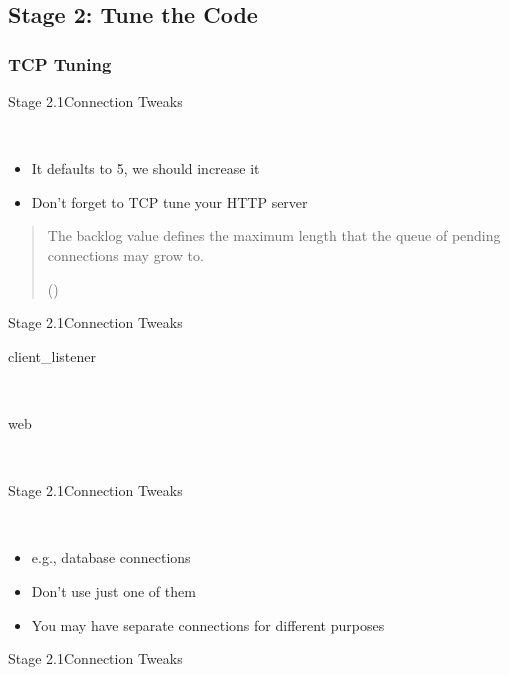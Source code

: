 \documentclass[utf8,hyperref={colorlinks=true}]{beamer}
\newenvironment{aquote}[1]{%
  \pushQED{#1}%
  \begin{quote}
}{%
  \par\noindent\hfill(\popQED)%
  \end{quote}%
}
\begin{document}
\subsection{Stage 2: Tune the Code}
\subsubsection{TCP Tuning}
\begin{frame}{Stage 2.1}{Connection Tweaks}
	\begin{description}
		\item<+->[Backlog]\ \\
			\begin{itemize}
				\item It defaults to 5, we should increase it
				\item Don't forget to TCP tune your HTTP server
			\end{itemize}
	\end{description}
	\begin{aquote}{Erlang Docs}The backlog value defines the maximum length that the queue of pending connections may grow to.\end{aquote}
\end{frame}
\begin{frame}{Stage 2.1}{Connection Tweaks}
	\begin{description}
		\item[client\_listener]~\\\backlog
		\item[web]~\\\backlogweb
	\end{description}
\end{frame}
\begin{frame}{Stage 2.1}{Connection Tweaks}
	\begin{description}
		\item<+->[Outbound Connections]\ \\
			\begin{itemize}
				\item e.g., database connections
				\item Don't use just one of them
				\item You may have separate connections for different purposes
			\end{itemize}
	\end{description}
\end{frame}
\begin{frame}{Stage 2.1}{Connection Tweaks}
\end{frame}
\end{document}
